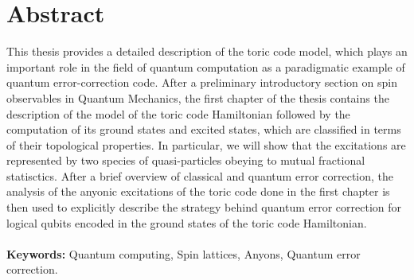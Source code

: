 \documentclass{Configuration_Files/PoliMi3i_thesis}
\begin{document}


\pagestyle{empty} %
\frontmatter %


\startpreamble
\setcounter{page}{1} %

\chapter*{Abstract} 
This thesis provides a detailed description of the toric code model, which plays an important
role in the field of quantum computation as a paradigmatic example of quantum error-correction code. 
After a preliminary introductory section on spin observables in Quantum Mechanics, the first chapter of the thesis contains the description of the model of the toric code Hamiltonian followed by the computation of its ground states and excited states, which are classified in terms of their topological properties. In particular, we will show that the excitations are represented by two species of quasi-particles obeying to mutual fractional statisctics. After a brief overview of classical and quantum error correction, the analysis of the anyonic excitations of the toric code done in the first chapter is then used to explicitly describe the strategy behind quantum error correction for logical qubits encoded in the ground states of the toric code Hamiltonian.
\\
\\
\textbf{Keywords:} Quantum computing, Spin lattices, Anyons, Quantum error correction. %
\end{document}
